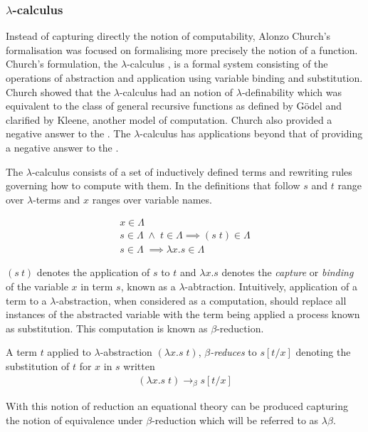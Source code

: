 \subsubsection{$\lambda$-calculus}
Instead of capturing directly the notion of computability, Alonzo Church's
formalisation was focused on formalising more precisely the notion of a
function.  Church's formulation, the $\lambda$-calculus \cite{church1932set}, is
a formal system consisting of the operations of abstraction and application
using variable binding and substitution. Church showed that the
$\lambda$-calculus had an notion of $\lambda$-definability
\cite{church1936unsolvable} which was equivalent to the class of general
recursive functions \cite{kleene1936general} as defined by G{\"o}del and
clarified by Kleene, another model of computation.  Church also provided a
negative answer to the \ent. The $\lambda$-calculus has applications beyond that
of providing a negative answer to the \ent.

The $\lambda$-calculus consists of a set of inductively defined terms and
rewriting rules governing how to compute with them. In the definitions that
follow $s$ and $t$ range over $\lambda$-terms and $x$ ranges over variable
names.

\begin{definition}
    \begin{gather*}
        x \in \Lambda \\
        s \in \Lambda \; \land \; t \in \Lambda \implies (s \; t) \in \Lambda \\
        s \in \Lambda \; \implies \lambda x . s \in \Lambda
    \end{gather*}
\end{definition}

$(s \: t)$ denotes the application of $s$ to $t$ and $\lambda x . s $ denotes
the \textit{capture} or \textit{binding} of the variable $x$ in term $s$, known
as a $\lambda$-abtraction. Intuitively, application of a term to a
$\lambda$-abstraction, when considered as a computation, should replace all
instances of the abstracted variable with the term being applied a process known
as substitution. This computation is known as $\beta$-reduction.


\begin{definition} A term $t$ applied to
    $\lambda$-abstraction $(\lambda x . s \; t)$, $\beta$\textit{-reduces} to
    $s[t/x]$ denoting the substitution of $t$ for $x$ in $s$ written
    \begin{align*}
        (\lambda x . s \; t) \rightarrow_{\beta} s[t/x]
    \end{align*}
\end{definition}
With this notion of reduction an equational theory can be produced capturing the
notion of equivalence under $\beta$-reduction which will be referred to as
$\lambda\beta$.

